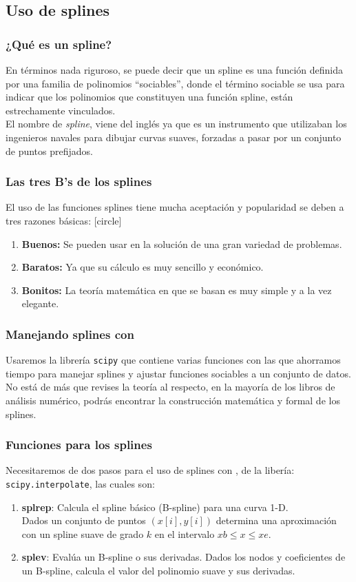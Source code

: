 \subsection{Uso de splines}
\begin{frame}
\frametitle{¿Qué es un spline?}
En términos nada riguroso, se puede decir que un spline es una función definida por una familia de polinomios ``sociables'', donde el término sociable se usa para indicar que los polinomios que constituyen una función spline, están estrechamente vinculados.
\\
\medskip
El nombre de \emph{spline}, viene del inglés ya que es un instrumento que utilizaban los ingenieros navales para dibujar curvas suaves, forzadas a pasar por un conjunto de puntos prefijados.
\end{frame}
\begin{frame}
\frametitle{Las tres B's de los splines}
El uso de las funciones splines tiene mucha aceptación y popularidad se deben a tres razones básicas:
[circle]
\begin{enumerate}[<+->]
\item \textbf{Buenos:} Se  pueden usar en la solución de una gran variedad de problemas.
\item \textbf{Baratos:} Ya que su cálculo es muy sencillo y económico.
\item \textbf{Bonitos:} La teoría matemática en que se basan es muy simple y a la vez elegante.
\end{enumerate}
\end{frame}
\begin{frame}
\frametitle{Manejando splines con \python}
Usaremos la librería \texttt{scipy} que contiene varias funciones con las que ahorramos tiempo para manejar splines y ajustar funciones sociables a un conjunto de datos.
\\
\medskip
No está de más que revises la teoría al respecto, en la mayoría de los libros de análisis numérico, podrás encontrar la construcción matemática y formal de los splines.
\end{frame}
\begin{frame}
\frametitle{Funciones para los splines}
Necesitaremos de dos pasos para el uso de splines con \python, de la libería: \texttt{scipy.interpolate}, las cuales son:
\begin{enumerate}
\item \textbf{splrep}: Calcula el spline básico (B-spline) para una curva 1-D.
\\
\medskip
Dados un conjunto de puntos $(x[i],y[i])$ determina una aproximación con un spline suave de grado $k$ en el intervalo $xb \leq x \leq xe$.
\item \textbf{splev}: Evalúa un B-spline o sus derivadas. Dados los nodos y coeficientes de un B-spline, calcula el valor del polinomio suave y sus derivadas.
\end{enumerate}
\end{frame}
